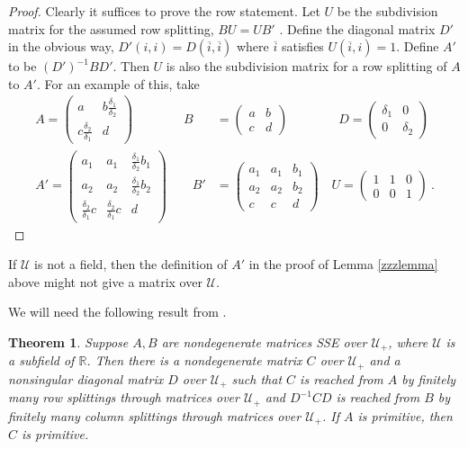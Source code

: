 \documentclass{amsart}
\newtheorem{theorem}{Theorem}[section]
\theoremstyle{definition}
\theoremstyle{remark}
\numberwithin{equation}{section}
\begin{document}
{{\begin{proof}
Clearly it suffices to prove the row statement. Let $U$ be 
the subdivision matrix for the assumed row splitting,
$BU=UB' $ .  Define the diagonal matrix $D'$ in the obvious 
way, $D'(i,i)=D(\overline i, \overline i)$ where $\overline i$
satisfies $U(\overline i,i)=1$. 
Define 
 $A'$ to be 
 $(D')^{-1}BD'$. Then $U$ is also 
the subdivision matrix for a row splitting of 
$A$ to $A' $. For an example of this, take 
\begin{align*} 
A= 
\begin{pmatrix} a & b\frac{\delta_1}{\delta_2 }\\ 
c\frac{\delta_2}{\delta_1 } & d \end{pmatrix} 
\qquad \quad \quad 
B&= 
\begin{pmatrix} a & b \\ c & d \end{pmatrix} 
\quad \quad \qquad  
D= 
\begin{pmatrix} \delta_1 & 0 \\ 0 & \delta_2 \end{pmatrix} 
\\
A'=\begin{pmatrix} a_1 & a_1 & \frac{\delta_1}{\delta_2 }b_1 
\\ a_2 &a_2&\frac{\delta_1}{\delta_2 } b_2 \\ 
\frac{\delta_2}{\delta_1 }c &\frac{\delta_2}{\delta_1 }c & d \end{pmatrix} 
\quad \quad 
B'&= 
\begin{pmatrix} a_1 & a_1 & b_1 \\ a_2 &a_2 &b_2 \\ c &c & d \end{pmatrix} 
 \quad 
U= 
\begin{pmatrix} 1 & 1 &0 \\ 
0 & 0& 1 \end{pmatrix} \ . 
\end{align*}
 \end{proof}
If $\mathcal U$ is not a field, then the definition of $A'$  
in the proof of Lemma \ref{zzzlemma} above might not 
give a matrix over $ \mathcal U$. 

We will need the following result from \cite{KR3}. 

\begin{theorem} \label{easystreet}
 Suppose $A,B$ are nondegenerate 
matrices SSE over $\mathcal U_+$, where $\mathcal U$ 
is a subfield of $\mathbb R$. Then there is a
 nondegenerate matrix $C$ over $\mathcal U_+$ and 
a nonsingular diagonal matrix $D$ over $\mathcal U_+$ 
such that $C$ is reached from $A$ by finitely many row splittings 
through  matrices over $\mathcal U_+$ and 
 $D^{-1}CD$ is reached from $B$ by finitely many column splittings 
through  matrices over $\mathcal U_+$.
 If $A$ is primitive, then $C$ is primitive. 
\end{theorem} 

}}
\end{document}
